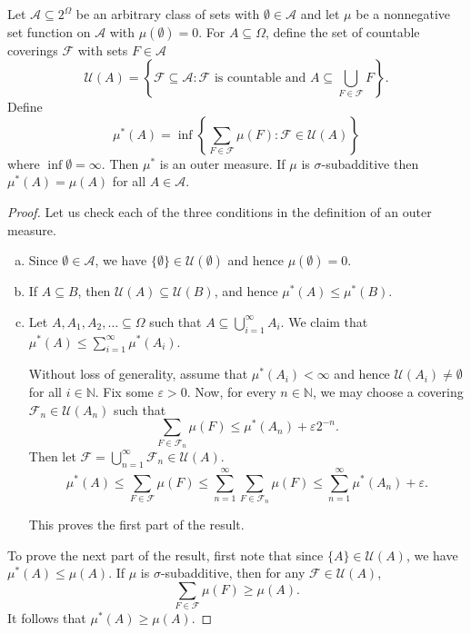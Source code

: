 \begin{lemma}
\label{set of countable coverings outer measure}
    Let $\mathcal{A}\subseteq 2^\Omega$ be an arbitrary class of sets with $\emptyset\in\mathcal{A}$ and let $\mu$ be a nonnegative set function on $\mathcal{A}$ with $\mu(\emptyset)=0$. For $A\subseteq\Omega$, define the set of countable coverings $\mathcal{F}$ with sets $F\in\mathcal{A}$
    $$\mathcal{U}(A)=\left\{\mathcal{F}\subseteq\mathcal{A} : \mathcal{F}\text{ is countable and }A\subseteq\bigcup_{F\in\mathcal{F}}F\right\}.$$
    Define
    $$\mu^*(A)=\inf\left\{\sum_{F\in\mathcal{F}}\mu(F) : \mathcal{F}\in\mathcal{U}(A) \right\}$$
    where $\inf\emptyset=\infty$. Then $\mu^*$ is an outer measure. If $\mu$ is $\sigma$-subadditive then $\mu^*(A)=\mu(A)$ for all $A\in\mathcal{A}$.
\end{lemma}
\begin{proof}
    Let us check each of the three conditions in the definition of an outer measure.
    \begin{enumerate}[(a)]
        \item Since $\emptyset\in\mathcal{A}$, we have $\{\emptyset\}\in\mathcal{U}(\emptyset)$ and hence $\mu(\emptyset)=0$.
        
        \item If $A\subseteq B$, then $\mathcal{U}(A)\subseteq\mathcal{U}(B)$, and hence $\mu^*(A)\leq\mu^*(B)$.
        
        \item Let $A,A_1,A_2,\ldots\subseteq\Omega$ such that $A\subseteq\bigcup_{i=1}^\infty A_i$. We claim that $\mu^*(A)\leq\sum_{i=1}^\infty \mu^*(A_i)$.
        
        Without loss of generality, assume that $\mu^*(A_i)<\infty$ and hence $\mathcal{U}(A_i)\neq\emptyset$ for all $i\in\mathbb{N}$. Fix some $\varepsilon>0$. Now, for every $n\in\mathbb{N}$, we may choose a covering $\mathcal{F}_n\in\mathcal{U}(A_n)$ such that
        $$\sum_{F\in\mathcal{F}_n}\mu(F)\leq\mu^*(A_n)+\varepsilon2^{-n}.$$
        Then let $\mathcal{F}=\bigcup_{n=1}^\infty \mathcal{F}_n\in\mathcal{U}(A)$.
        $$\mu^*(A)\leq\sum_{F\in\mathcal{F}}\mu(F)\leq\sum_{n=1}^\infty\sum_{F\in\mathcal{F}_n}\mu(F)\leq\sum_{n=1}^\infty \mu^*(A_n) + \varepsilon.$$
        
        This proves the first part of the result.
    \end{enumerate}
    
    To prove the next part of the result, first note that since $\{A\}\in\mathcal{U}(A)$, we have $\mu^*(A)\leq\mu(A)$. If $\mu$ is $\sigma$-subadditive, then for any $\mathcal{F}\in\mathcal{U}(A)$,
    $$\sum_{F\in\mathcal{F}}\mu(F)\geq\mu(A).$$
    It follows that $\mu^*(A)\geq\mu(A).$
\end{proof}

